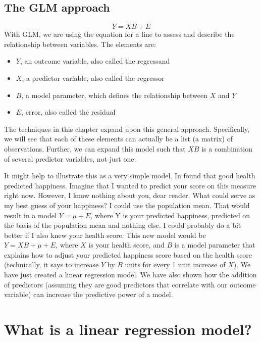 \documentclass[
]{book}
\begin{document}
\hypertarget{the-glm-approach}{%
\subsection{The GLM approach}\label{the-glm-approach}}

\[
Y = XB + E
\]
With GLM, we are using the equation for a line to assess and describe the relationship between variables. The elements are:

\begin{itemize}
\item
  \(Y\), an outcome variable, also called the regressand
\item
  \(X\), a predictor variable, also called the regressor
\item
  \(B\), a model parameter, which defines the relationship between \(X\) and \(Y\)
\item
  \(E\), error, also called the residual
\end{itemize}

The techniques in this chapter expand upon this general approach. Specifically, we will see that each of these elements can actually be a list (a matrix) of observations. Further, we can expand this model such that \(XB\) is a combination of several predictor variables, not just one.

It might help to illustrate this as a very simple model. In \citet{Kozma1983} found that good health predicted happiness. Imagine that I wanted to predict your score on this measure right now. However, I know nothing about you, dear reader. What could serve as my best guess of your happiness? I could use the population mean. That would result in a model \(Y = \mu + E\), where Y is your predicted happiness, predicted on the basis of the population mean and nothing else. I could probably do a bit better if I also knew your health score. This new model would be \(Y = XB + \mu + E\), where \(X\) is your health score, and \(B\) is a model parameter that explains how to adjust your predicted happiness score based on the health score (technically, it says to increase \(Y\) by \(B\) units for every 1 unit increase of \(X\)). We have just created a linear regression model. We have also shown how the addition of predictors (assuming they are good predictors that correlate with our outcome variable) can increase the predictive power of a model.

\hypertarget{introregression}{%
\section{What is a linear regression model?}\label{introregression}}
\end{document}
